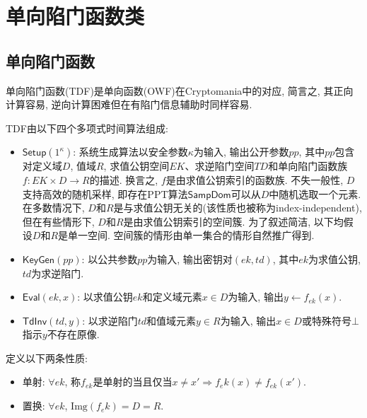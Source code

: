 \section{单向陷门函数类}

\subsection{单向陷门函数}
单向陷门函数(TDF)是单向函数(OWF)在Cryptomania中的对应, 简言之, 其正向计算容易, 逆向计算困难但在有陷门信息辅助时同样容易. 
\begin{definition}[单向陷门函数]
TDF由以下四个多项式时间算法组成: 
\begin{itemize}
\item $\mathsf{Setup}(1^\kappa)$: 系统生成算法以安全参数$\kappa$为输入, 输出公开参数$pp$, 
	其中$pp$包含对定义域$D$, 值域$R$, 求值公钥空间$EK$、求逆陷门空间$TD$和单向陷门函数族
	$f: EK \times D \rightarrow R$的描述. 换言之, $f$是由求值公钥索引的函数族.  
	不失一般性, $D$支持高效的随机采样, 即存在PPT算法$\mathsf{SampDom}$可以从$D$中随机选取一个元素.   
	在多数情况下, $D$和$R$是与求值公钥无关的(该性质也被称为index-independent), 
	但在有些情形下, $D$和$R$是由求值公钥索引的空间簇. 
	为了叙述简洁, 以下均假设$D$和$R$是单一空间. 空间簇的情形由单一集合的情形自然推广得到.   

\item $\mathsf{KeyGen}(pp)$: 以公共参数$pp$为输入, 输出密钥对$(ek, td)$, 
	其中$ek$为求值公钥, $td$为求逆陷门. 

\item $\mathsf{Eval}(ek, x)$: 以求值公钥$ek$和定义域元素$x \in D$为输入, 输出$y \leftarrow f_{ek}(x)$.  

\item $\mathsf{TdInv}(td, y)$: 以求逆陷门$td$和值域元素$y \in R$为输入, 输出$x \in D$或特殊符号$\bot$指示$y$不存在原像.       
\end{itemize}
\end{definition}

定义以下两条性质: 
\begin{itemize}
\item 单射: $\forall ek$, 称$f_{ek}$是单射的当且仅当$x \neq x' \Rightarrow f_ek(x) \neq f_{ek}(x')$. 
\item 置换: $\forall ek$, $\text{Img}(f_ek) = D = R$.
\end{itemize}

